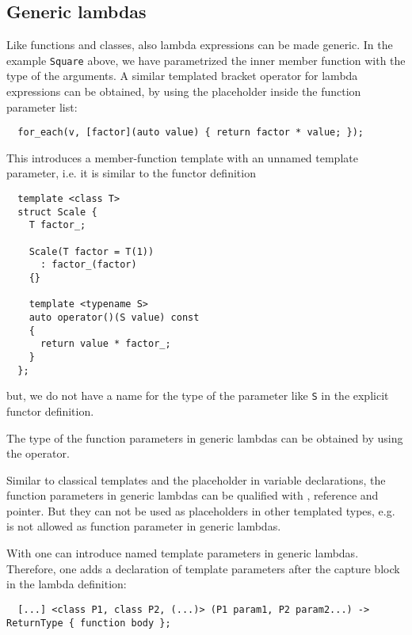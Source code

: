 \subsection{Generic lambdas}
Like functions and classes, also lambda expressions can be made generic. In the example \texttt{Square} above, we have parametrized the
inner member function  with the type of the arguments. A similar templated bracket operator for lambda expressions
can be obtained, by using the placeholder  inside the function parameter list:
%
\begin{verbatim}
  for_each(v, [factor](auto value) { return factor * value; });
\end{verbatim}
%
This introduces a member-function template with an unnamed template parameter, i.e. it is similar to the functor definition
%
\begin{verbatim}
  template <class T>
  struct Scale {
    T factor_;

    Scale(T factor = T(1))
      : factor_(factor)
    {}

    template <typename S>
    auto operator()(S value) const
    {
      return value * factor_;
    }
  };
\end{verbatim}
%
but, we do not have a name for the type of the parameter like \texttt{S} in the explicit functor definition.

\begin{rem}
  The type of the function parameters in generic lambdas can be obtained by using the  operator.
\end{rem}

Similar to classical templates and the  placeholder in variable declarations, the function parameters in generic lambdas
can be qualified with , reference and pointer. But they can not be used as placeholders in other templated types, e.g.
 is not allowed as function parameter in generic lambdas.

\begin{rem}
  With \marginpar{[\cxx{20}]} one can introduce named template parameters in generic lambdas. Therefore, one adds a declaration
  of template parameters after the capture block in the lambda definition:
  \begin{verbatim}
  [...] <class P1, class P2, (...)> (P1 param1, P2 param2...) -> ReturnType { function body };
  \end{verbatim}
\end{rem}


